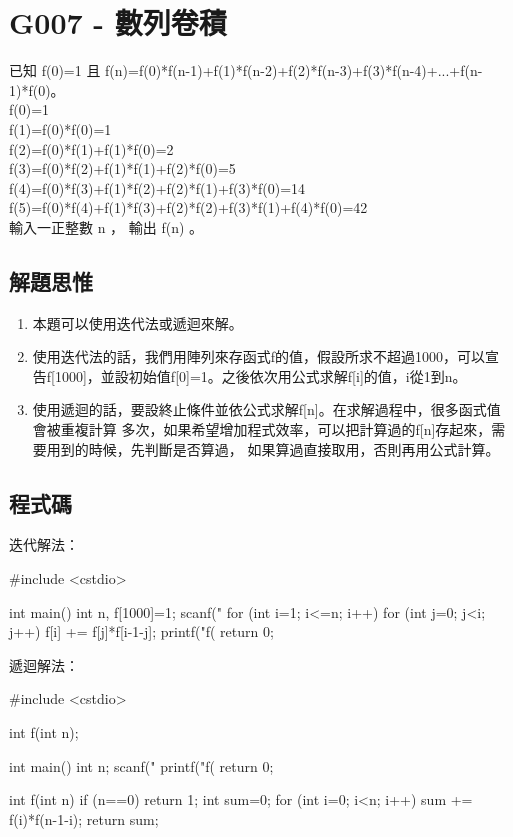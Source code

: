 \section{G007 - 數列卷積}
已知 f(0)=1 且 
f(n)=f(0)*f(n-1)+f(1)*f(n-2)+f(2)*f(n-3)+f(3)*f(n-4)+...+f(n-1)*f(0)。 \\
f(0)=1 \\
f(1)=f(0)*f(0)=1 \\
f(2)=f(0)*f(1)+f(1)*f(0)=2 \\
f(3)=f(0)*f(2)+f(1)*f(1)+f(2)*f(0)=5 \\
f(4)=f(0)*f(3)+f(1)*f(2)+f(2)*f(1)+f(3)*f(0)=14 \\
f(5)=f(0)*f(4)+f(1)*f(3)+f(2)*f(2)+f(3)*f(1)+f(4)*f(0)=42 \\
輸入一正整數 n ， 輸出 f(n) 。
\subsection{解題思惟}
\begin{enumerate}
	\item 本題可以使用迭代法或遞迴來解。
	\item 使用迭代法的話，我們用陣列來存函式f的值，假設所求不超過1000，可以宣告f[1000]，並設初始值f[0]=1。之後依次用公式求解f[i]的值，i從1到n。
	\item 使用遞迴的話，要設終止條件並依公式求解f[n]。在求解過程中，很多函式值會被重複計算
	多次，如果希望增加程式效率，可以把計算過的f[n]存起來，需要用到的時候，先判斷是否算過，
	如果算過直接取用，否則再用公式計算。
\end{enumerate}

\subsection{程式碼}
迭代解法：
\begin{cppcode}
#include <cstdio>

int main()
{
	int n, f[1000]={1};
	scanf("%
	for (int i=1; i<=n; i++) {
		for (int j=0; j<i; j++) f[i] += f[j]*f[i-1-j];
	}
	printf("f(%
	return 0;
}
\end{cppcode}
遞迴解法：
\begin{cppcode}
#include <cstdio>

int f(int n);

int main()
{
	int n;
	scanf("%
	printf("f(%
	return 0;
}

int f(int n)
{
	if (n==0) return 1;
	int sum=0;
	for (int i=0; i<n; i++) sum += f(i)*f(n-1-i);
	return sum;
}
\end{cppcode}
